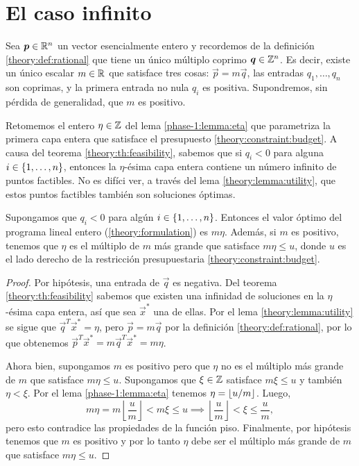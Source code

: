 \chapter{El caso infinito}
\label{chap:inf}
\noindent
Sea $\boldsymbol{p} \in \mathbb{R}^n$ un vector esencialmente entero y recordemos de la definición
\ref{theory:def:rational} que tiene un único múltiplo coprimo $\boldsymbol{q} \in \mathbb{Z}^n$. Es decir, existe
un único escalar $m \in \mathbb{R}$ que satisface tres cosas: $\vec{p} = m\vec{q}$, las entradas $q_1,
\ldots, q_n$ son coprimas, y la primera entrada no nula $q_i$ es positiva. Supondremos, sin pérdida
de generalidad, que $m$ es positivo.

Retomemos el entero $\eta \in \mathbb{Z}$ del lema \ref{phase-1:lemma:eta} que parametriza la primera capa
entera que satisface el presupuesto \eqref{theory:constraint:budget}. A causa del teorema
\ref{theory:th:feasibility}, sabemos que si $q_i < 0$ para alguna $i \in \lbrace 1, \ldots, n \rbrace$,
entonces la $\eta$-ésima capa entera contiene un número infinito de puntos factibles. No es difíci
ver, a través del lema \ref{theory:lemma:utility}, que estos puntos factibles también son soluciones
óptimas.

\begin{corollary}
	\label{cor:inf:obj}
	Supongamos que $q_i < 0$ para algún $i \in \lbrace 1, \ldots, n \rbrace$. Entonces el valor óptimo del
	programa lineal entero (\ref{theory:formulation}) es $m\eta$. Además, si $m$ es positivo,
	tenemos que $\eta$ es el múltiplo de $m$ más grande que satisface $m\eta \leq u$, donde $u$ es
	el lado derecho de la restricción presupuestaria \eqref{theory:constraint:budget}.
\end{corollary}
\begin{proof}
	Por hipótesis, una entrada de $\vec{q}$ es negativa. Del teorema
	\ref{theory:th:feasibility} sabemos que existen una infinidad de soluciones en la $\eta$-ésima
	capa entera, así que sea $\vec{x}^*$ una de ellas. Por el lema \ref{theory:lemma:utility} se
	sigue que $\vec{q}^T\vec{x}^* = \eta$, pero $\vec{p} = m\vec{q}$ por la definición
	\ref{theory:def:rational}, por lo que obtenemos $\vec{p}^T\vec{x}^* = m\vec{q}^T\vec{x}^* =
	m\eta$.

	Ahora bien, supongamos $m$ es positivo pero que $\eta$ no es el múltiplo más grande de $m$ que
	satisface $m\eta \leq u$. Supongamos que $\xi \in \mathbb{Z}$ satisface $m\xi \leq u$ y también $\eta <
	\xi$. Por el lema \ref{phase-1:lemma:eta} tenemos $\eta = \left\lfloor u/m \right\rfloor$. Luego,
	\begin{equation*}
		m\eta = m\left\lfloor \frac{u}{m} \right\rfloor < m\xi \leq u
		\implies \left\lfloor \frac{u}{m} \right\rfloor < \xi \leq \frac{u}{m},
	\end{equation*}
	pero esto contradice las propiedades de la función piso. Finalmente, por hipótesis tenemos que
	$m$ es positivo y por lo tanto $\eta$ debe ser el múltiplo más grande de $m$ que satisface
	$m\eta \leq u$.
\end{proof}

